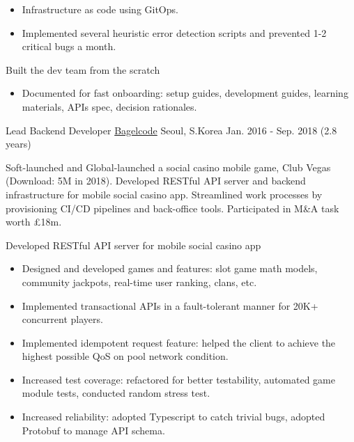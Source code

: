 \begin{cventries}
{\begin{cvitems}
\begin{itemize}[leftmargin=2ex]
          \item Infrastructure as code using GitOps.
          \item Implemented several heuristic error detection scripts and prevented 1-2 critical bugs a month.
        \end{itemize}
        \item Built the dev team from the scratch
        \begin{itemize}[leftmargin=2ex]
          \item Documented for fast onboarding: setup guides, development guides, learning materials, APIs spec, decision rationales.
        \end{itemize}
      \end{cvitems}
    }

  \cventry
    {Lead Backend Developer} %
    {\href{https://bagelcode.com}{Bagelcode}} %
    {Seoul, S.Korea} %
    {Jan. 2016 - Sep. 2018 (2.8 years)} %
    {
      Soft-launched and Global-launched a social casino mobile game, Club Vegas (Download: 5M in 2018). Developed RESTful API server and backend infrastructure for mobile social casino app. Streamlined work processes by provisioning CI/CD pipelines and back-office tools. Participated in M\&A task worth £18m.\newline
      \vspace{6mm}
      \begin{cvitems} %
        \item Developed RESTful API server for mobile social casino app
        \begin{itemize}[leftmargin=2ex]
          \item Designed and developed games and features: slot game math models, community jackpots, real-time user ranking, clans, etc.
          \item Implemented transactional APIs in a fault-tolerant manner for 20K+ concurrent players.
          \item Implemented idempotent request feature: helped the client to achieve the highest possible QoS on pool network condition.
          \item Increased test coverage: refactored for better testability, automated game module tests, conducted random stress test.
          \item Increased reliability: adopted Typescript to catch trivial bugs, adopted Protobuf to manage API schema.

\end{itemize}
\end{cvitems}}
\end{cventries}
